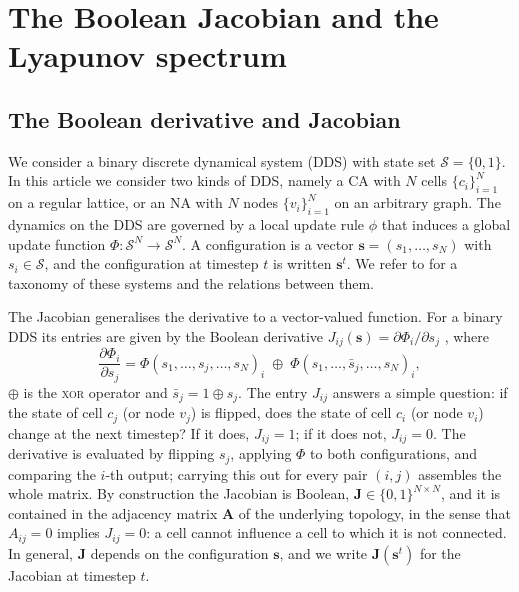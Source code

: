 \documentclass[a4paper,fleqn]{cas-dc}
\begin{document}
\section{The Boolean Jacobian and the Lyapunov spectrum}
\label{sec:jacobian}

\subsection{The Boolean derivative and Jacobian}

We consider a binary discrete dynamical system (DDS) with state set $\mathcal{S}=\{0,1\}$. In this article we consider two kinds of DDS, namely a CA with $N$ cells $\{c_i\}_{i=1}^N$ on a regular lattice, or an NA with $N$ nodes $\{v_i\}_{i=1}^N$ on an arbitrary graph. The dynamics on the DDS are governed by a local update rule $\phi$ that induces a global update function $\Phi:\mathcal{S}^N\to\mathcal{S}^N$. A configuration is a vector $\mathbf{s}=(s_1,\dots,s_N)$ with $s_i\in\mathcal{S}$, and the configuration at timestep $t$ is written $\mathbf{s}^t$. We refer to \cite{rollier2025comprehensive} for a taxonomy of these systems and the relations between them.

The Jacobian generalises the derivative to a vector-valued function. For a binary DDS its entries are given by the Boolean derivative $J_{ij}(\mathbf{s})=\partial\Phi_i/\partial s_j$ \cite{vichniac1990boolean,bagnoli1992damage}, where
\begin{equation}
    \label{eq:boolean-derivative}
    \frac{\partial\Phi_i}{\partial s_j}
    =\Phi(s_1,\dots,s_j,\dots,s_N)_i\;\oplus\;
     \Phi(s_1,\dots,\bar{s}_j,\dots,s_N)_i,
\end{equation}
$\oplus$ is the \textsc{xor} operator and $\bar{s}_j=1\oplus s_j$. The entry $J_{ij}$ answers a simple question: if the state of cell $c_j$ (or node $v_j$) is flipped, does the state of cell $c_i$ (or node $v_i$) change at the next timestep? If it does, $J_{ij}=1$; if it does not, $J_{ij}=0$. The derivative is evaluated by flipping $s_j$, applying $\Phi$ to both configurations, and comparing the $i$-th output; carrying this out for every pair $(i,j)$ assembles the whole matrix. By construction the Jacobian is Boolean, $\mathbf{J}\in\{0,1\}^{N\times N}$, and it is contained in the adjacency matrix $\mathbf{A}$ of the underlying topology, in the sense that $A_{ij}=0$ implies $J_{ij}=0$: a cell cannot influence a cell to which it is not connected. In general, $\mathbf{J}$ depends on the configuration $\mathbf{s}$, and we write
$\mathbf{J}(\mathbf{s}^t)$ for the Jacobian at timestep $t$.
\end{document}

